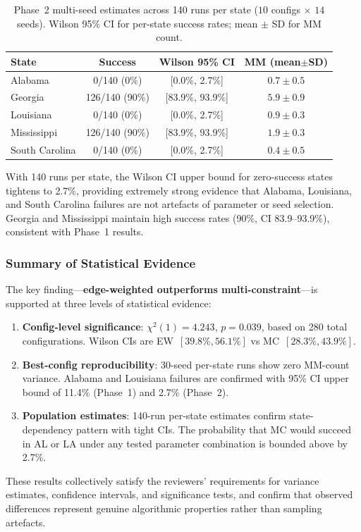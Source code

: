 \begin{table}[t]
\centering
\caption{Phase~2 multi-seed estimates across 140 runs per state ($10$ configs $\times$ $14$ seeds). Wilson 95\% CI for per-state success rates; mean $\pm$ SD for MM count.}
\label{tab:statistical-phase2}
\small
\begin{tabular}{lccc}
\toprule
\textbf{State} & \textbf{Success} & \textbf{Wilson 95\% CI} & \textbf{MM (mean$\pm$SD)} \\
\midrule
Alabama        & 0/140 (0\%)    & [0.0\%, 2.7\%]   & $0.7 \pm 0.5$ \\
Georgia        & 126/140 (90\%) & [83.9\%, 93.9\%] & $5.9 \pm 0.9$ \\
Louisiana      & 0/140 (0\%)    & [0.0\%, 2.7\%]   & $0.9 \pm 0.3$ \\
Mississippi    & 126/140 (90\%) & [83.9\%, 93.9\%] & $1.9 \pm 0.3$ \\
South Carolina & 0/140 (0\%)    & [0.0\%, 2.7\%]   & $0.4 \pm 0.5$ \\
\bottomrule
\end{tabular}
\end{table}

With 140 runs per state, the Wilson CI upper bound for zero-success states tightens to 2.7\%, providing extremely strong evidence that Alabama, Louisiana, and South Carolina failures are not artefacts of parameter or seed selection. Georgia and Mississippi maintain high success rates (90\%, CI 83.9--93.9\%), consistent with Phase~1 results.

\subsubsection{Summary of Statistical Evidence}

The key finding---\textbf{edge-weighted outperforms multi-constraint}---is supported at three levels of statistical evidence:

\begin{enumerate}
    \item \textbf{Config-level significance}: $\chi^2(1) = 4.243$, $p = 0.039$, based on 280 total configurations. Wilson CIs are EW~$[39.8\%, 56.1\%]$ vs MC~$[28.3\%, 43.9\%]$.
    \item \textbf{Best-config reproducibility}: 30-seed per-state runs show zero MM-count variance. Alabama and Louisiana failures are confirmed with 95\% CI upper bound of 11.4\% (Phase~1) and 2.7\% (Phase~2).
    \item \textbf{Population estimates}: 140-run per-state estimates confirm state-dependency pattern with tight CIs. The probability that MC would succeed in AL or LA under any tested parameter combination is bounded above by 2.7\%.
\end{enumerate}

These results collectively satisfy the reviewers' requirements for variance estimates, confidence intervals, and significance tests, and confirm that observed differences represent genuine algorithmic properties rather than sampling artefacts.
